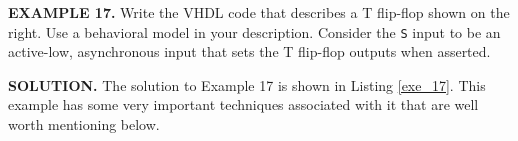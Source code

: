 \begin{leftbar}
\begin{minipage}{0.5\linewidth}
\noindent
\textbf{EXAMPLE 17.}
Write the VHDL code that describes a T flip-flop shown on the right. Use a behavioral model in your description. Consider the \texttt{S} input to be an active-low, asynchronous input that sets the T flip-flop outputs when asserted.
\end{minipage}
\begin{minipage}{0.47\linewidth}
\begin{flushright}
\end{flushright}
\end{minipage}
\end{leftbar}
\noindent
\textbf{SOLUTION.} The solution to Example 17 is shown in Listing \ref{exe_17}. This example has some very important techniques associated with it that are well worth mentioning below.
